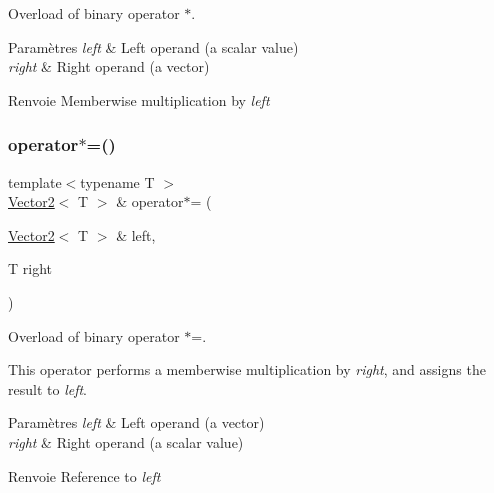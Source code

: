Overload of binary operator $\ast$. 


\begin{DoxyParams}{Paramètres}
{\em left} & Left operand (a scalar value) \\
\hline
{\em right} & Right operand (a vector)\\
\hline
\end{DoxyParams}
\begin{DoxyReturn}{Renvoie}
Memberwise multiplication by {\itshape left} 
\end{DoxyReturn}
\mbox{\label{classsf_1_1Vector2_abea24cb28c0d6e2957e259ba4e65d70e}} 
\subsubsection{\texorpdfstring{operator$\ast$=()}{operator*=()}}
{\footnotesize\ttfamily template$<$typename T $>$ \\
\hyperlink{classsf_1_1Vector2}{Vector2}$<$ T $>$ \& operator$\ast$= (\begin{DoxyParamCaption}\item[{\hyperlink{classsf_1_1Vector2}{Vector2}$<$ T $>$ \&}]{left,  }\item[{T}]{right }\end{DoxyParamCaption})\hspace{0.3cm}{\ttfamily [related]}}



Overload of binary operator $\ast$=. 

This operator performs a memberwise multiplication by {\itshape right}, and assigns the result to {\itshape left}.


\begin{DoxyParams}{Paramètres}
{\em left} & Left operand (a vector) \\
\hline
{\em right} & Right operand (a scalar value)\\
\hline
\end{DoxyParams}
\begin{DoxyReturn}{Renvoie}
Reference to {\itshape left} 
\end{DoxyReturn}
\mbox{\label{classsf_1_1Vector2_a72421239823c38a6b780c86a710ead07}} 

